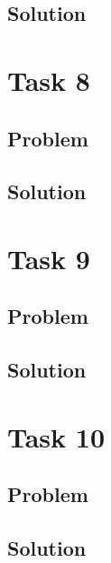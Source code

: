 \documentclass[a4paper, 10pt]{article}
\begin{document}
		\subsection{Solution}
	
	\section{Task 8}
	
		\subsection{Problem}
		
		\subsection{Solution}
	
	\section{Task 9}
	
		\subsection{Problem}
		
		\subsection{Solution}
	
	\section{Task 10}
	
		\subsection{Problem}
		
		\subsection{Solution}
\end{document}
